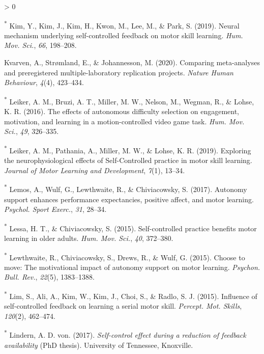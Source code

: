 \documentclass[
  english,
  man,floatsintext]{apa7}
\newlength{\cslhangindent}
\newenvironment{CSLReferences}[2] %
 {%
  \setlength{\parindent}{0pt}
  \ifodd #1 \everypar{\setlength{\hangindent}{\cslhangindent}}\ignorespaces\fi
  \ifnum #2 > 0
  \setlength{\parskip}{#2\baselineskip}
  \fi
 }%
 {}
\begin{document}
\begin{CSLReferences}{1}{0}
\leavevmode\hypertarget{ref-Kim2019-sl}{}%
\textsuperscript{*} Kim, Y., Kim, J., Kim, H., Kwon, M., Lee, M., \& Park, S. (2019). Neural mechanism underlying self-controlled feedback on motor skill learning. \emph{Hum. Mov. Sci.}, \emph{66}, 198--208.

\leavevmode\hypertarget{ref-kvarven2020}{}%
Kvarven, A., Strømland, E., \& Johannesson, M. (2020). Comparing meta-analyses and preregistered multiple-laboratory replication projects. \emph{Nature Human Behaviour}, \emph{4}(4), 423--434.

\leavevmode\hypertarget{ref-Leiker2016-zd}{}%
\textsuperscript{*} Leiker, A. M., Bruzi, A. T., Miller, M. W., Nelson, M., Wegman, R., \& Lohse, K. R. (2016). The effects of autonomous difficulty selection on engagement, motivation, and learning in a motion-controlled video game task. \emph{Hum. Mov. Sci.}, \emph{49}, 326--335.

\leavevmode\hypertarget{ref-Leiker2019-fz}{}%
\textsuperscript{*} Leiker, A. M., Pathania, A., Miller, M. W., \& Lohse, K. R. (2019). Exploring the neurophysiological effects of {Self-Controlled} practice in motor skill learning. \emph{Journal of Motor Learning and Development}, \emph{7}(1), 13--34.

\leavevmode\hypertarget{ref-Lemos2017-qx}{}%
\textsuperscript{*} Lemos, A., Wulf, G., Lewthwaite, R., \& Chiviacowsky, S. (2017). Autonomy support enhances performance expectancies, positive affect, and motor learning. \emph{Psychol. Sport Exerc.}, \emph{31}, 28--34.

\leavevmode\hypertarget{ref-Lessa2015-eq}{}%
\textsuperscript{*} Lessa, H. T., \& Chiviacowsky, S. (2015). Self-controlled practice benefits motor learning in older adults. \emph{Hum. Mov. Sci.}, \emph{40}, 372--380.

\leavevmode\hypertarget{ref-Lewthwaite2015-bd}{}%
\textsuperscript{*} Lewthwaite, R., Chiviacowsky, S., Drews, R., \& Wulf, G. (2015). Choose to move: The motivational impact of autonomy support on motor learning. \emph{Psychon. Bull. Rev.}, \emph{22}(5), 1383--1388.

\leavevmode\hypertarget{ref-Lim2015-qs}{}%
\textsuperscript{*} Lim, S., Ali, A., Kim, W., Kim, J., Choi, S., \& Radlo, S. J. (2015). Influence of self-controlled feedback on learning a serial motor skill. \emph{Percept. Mot. Skills}, \emph{120}(2), 462--474.

\leavevmode\hypertarget{ref-Von_Lindern2017-al}{}%
\textsuperscript{*} Lindern, A. D. von. (2017). \emph{Self-control effect during a reduction of feedback availability} (PhD thesis). University of Tennessee, Knoxville.


\end{CSLReferences}
\end{document}
